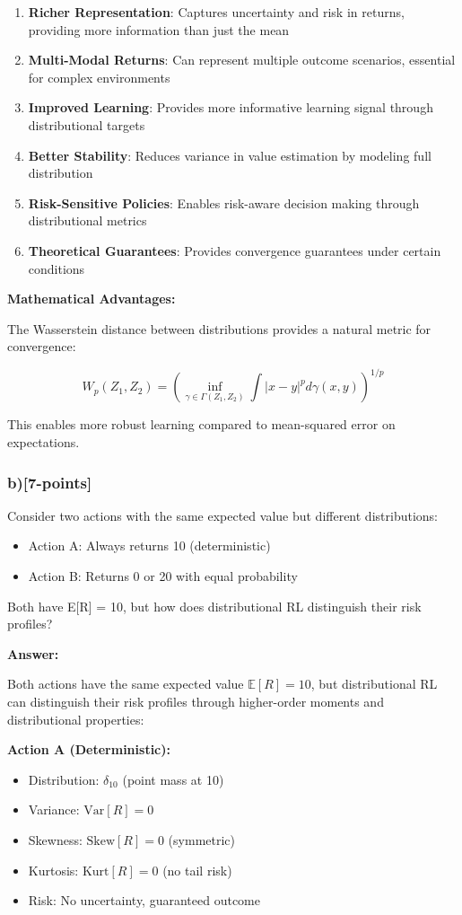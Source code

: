 \documentclass[12pt]{article}
\begin{document}
{{\begin{enumerate}
\item \textbf{Richer Representation}: Captures uncertainty and risk in returns, providing more information than just the mean
\item \textbf{Multi-Modal Returns}: Can represent multiple outcome scenarios, essential for complex environments
\item \textbf{Improved Learning}: Provides more informative learning signal through distributional targets
\item \textbf{Better Stability}: Reduces variance in value estimation by modeling full distribution
\item \textbf{Risk-Sensitive Policies}: Enables risk-aware decision making through distributional metrics
\item \textbf{Theoretical Guarantees}: Provides convergence guarantees under certain conditions
\end{enumerate}

\textbf{Mathematical Advantages:}

The Wasserstein distance between distributions provides a natural metric for convergence:

\begin{equation}
W_p(Z_1, Z_2) = \left(\inf_{\gamma \in \Gamma(Z_1, Z_2)} \int |x-y|^p d\gamma(x,y)\right)^{1/p}
\end{equation}

This enables more robust learning compared to mean-squared error on expectations.

\subsubsection{b)[7-points]} Consider two actions with the same expected value but different distributions:
\begin{itemize}
\item Action A: Always returns 10 (deterministic)
\item Action B: Returns 0 or 20 with equal probability
\end{itemize}
Both have E[R] = 10, but how does distributional RL distinguish their risk profiles?

\textbf{Answer:}

Both actions have the same expected value $\mathbb{E}[R] = 10$, but distributional RL can distinguish their risk profiles through higher-order moments and distributional properties:

\textbf{Action A (Deterministic):}
\begin{itemize}
\item Distribution: $\delta_{10}$ (point mass at 10)
\item Variance: $\text{Var}[R] = 0$
\item Skewness: $\text{Skew}[R] = 0$ (symmetric)
\item Kurtosis: $\text{Kurt}[R] = 0$ (no tail risk)
\item Risk: No uncertainty, guaranteed outcome
\end{itemize}

}}
\end{document}
